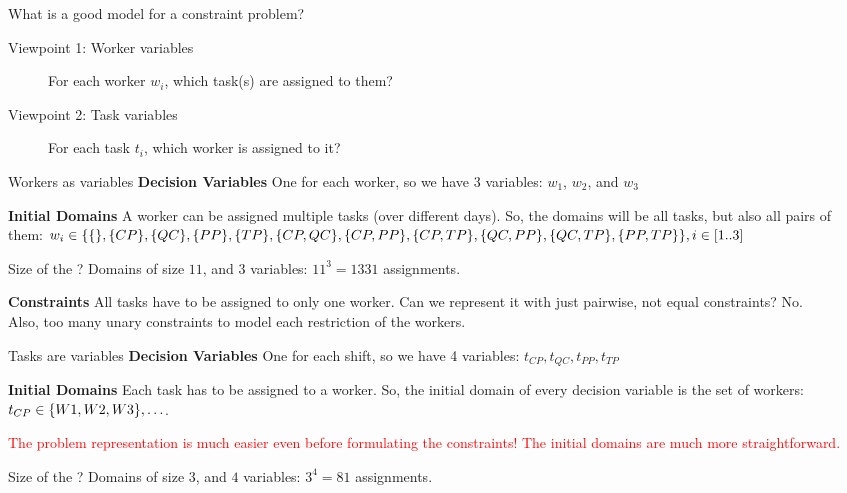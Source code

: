 \documentclass{cons-beamer}
\begin{document}
{\begin{frame}{What is a good model for a constraint problem?}
    \begin{description}
      \item[Viewpoint 1: Worker variables] For each worker $w_i$, which task(s) are assigned to them?
      \item[Viewpoint 2: Task variables] For each task $t_i$, which worker is assigned to it?
    \end{description}

  \end{frame}

  \begin{frame}{Workers as variables}
    \textbf{Decision Variables}
    One for each worker, so we have 3 variables: $w_1$, $w_2$, and $w_3$
    \parBreak

    \textbf{Initial Domains} A worker can be assigned multiple tasks (over different days).
    So, the domains will be all tasks, but also all pairs of them:
    $
    w_i \in \{
      \{\},
      \{CP\},
      \{QC\},
      \{PP\},
      \{TP\},
      \{CP, QC\},
      \{CP, PP\},
      \{CP, TP\},\allowbreak
      \{QC, PP\},
      \{QC, TP\},
      \{PP, TP\}
    \}, i \in [1..3]
    $

    Size of the ? Domains of size $11$, and $3$ variables: $11^3 = 1331$ assignments.

    \parBreak

    \textbf{Constraints} All tasks have to be assigned to only one
    worker.
    Can we represent it with just pairwise, not equal
    constraints?
    \alert{No}. \\
    \alert{Also, too many unary constraints to model each restriction of the workers.}
  \end{frame}

  \begin{frame}{Tasks are variables}
    \textbf{Decision Variables}
    One for each shift, so we have 4 variables: $t_{CP}, t_{QC}, t_{PP}, t_{TP}$
    \vfill

    \textbf{Initial Domains} Each task has to be assigned to a worker.
    So, the initial domain of every decision variable is the set of workers:
    $t_{CP} \in \{W1, W2, W3\}, \ldots$.
    \vfill

    \textcolor{red}{The problem representation is much easier even
      before formulating the constraints!
    The initial domains are much more straightforward.}
    \vfill

    Size of the ?
    Domains of size $3$, and $4$ variables: $3^4 = 81$ assignments.
  \end{frame}

}
\end{document}
